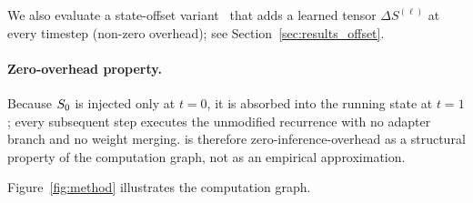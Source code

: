 \documentclass{article}
\begin{document}
We also evaluate a state-offset variant~\cite{state_offset} that adds a learned tensor $\Delta S^{(\ell)}$ at every timestep (non-zero overhead); see Section~\ref{sec:results_offset}.

\paragraph{Zero-overhead property.}
Because $S_0$ is injected only at $t{=}0$, it is absorbed into the running state at $t{=}1$; every subsequent step executes the unmodified recurrence with no adapter branch and no weight merging.
\methodshort is therefore zero-inference-overhead as a structural property of the computation graph, not as an empirical approximation.

Figure~\ref{fig:method} illustrates the computation graph.
\end{document}
